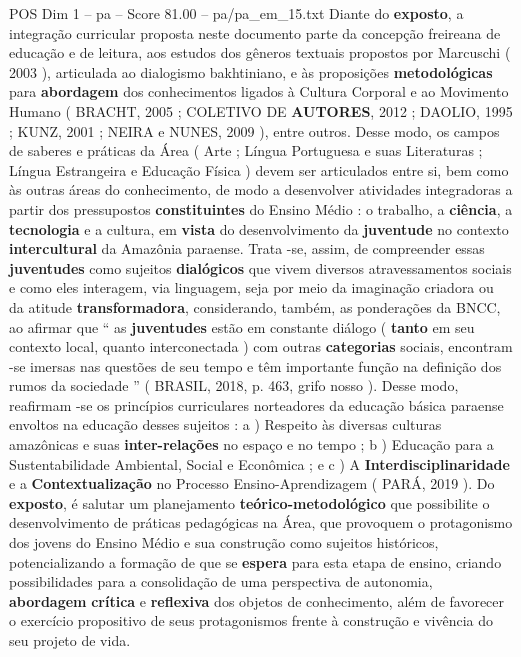 \begin{textsample}{POS Dim 1 – pa – Score 81.00 – pa/pa\_em\_15.txt}
Diante do \textbf{exposto}, a integração curricular proposta neste documento parte da concepção freireana de educação e de leitura, aos estudos dos gêneros textuais propostos por Marcuschi ( 2003 ), articulada ao dialogismo bakhtiniano, e às proposições \textbf{metodológicas} para \textbf{abordagem} dos conhecimentos ligados à Cultura Corporal e ao Movimento Humano ( BRACHT, 2005 ; COLETIVO DE \textbf{AUTORES}, 2012 ; DAOLIO, 1995 ; KUNZ, 2001 ; NEIRA e NUNES, 2009 ), entre outros.
Desse modo, os campos de saberes e práticas da Área ( Arte ; Língua Portuguesa e suas Literaturas ; Língua Estrangeira e Educação Física ) devem ser articulados entre si, bem como às outras áreas do conhecimento, de modo a desenvolver atividades integradoras a partir dos pressupostos \textbf{constituintes} do Ensino Médio : o trabalho, a \textbf{ciência}, a \textbf{tecnologia} e a cultura, em \textbf{vista} do desenvolvimento da \textbf{juventude} no contexto \textbf{intercultural} da Amazônia paraense.
Trata -se, assim, de compreender essas \textbf{juventudes} como sujeitos \textbf{dialógicos} que vivem diversos atravessamentos sociais e como eles interagem, via linguagem, seja por meio da imaginação criadora ou da atitude \textbf{transformadora}, considerando, também, as ponderações da BNCC, ao afirmar que “ as \textbf{juventudes} estão em constante diálogo ( \textbf{tanto} em seu contexto local, quanto interconectada ) com outras \textbf{categorias} sociais, encontram -se imersas nas questões de seu tempo e têm importante função na definição dos rumos da sociedade ” ( BRASIL, 2018, p. 463, grifo nosso ).
Desse modo, reafirmam -se os princípios curriculares norteadores da educação básica paraense envoltos na educação desses sujeitos : a ) Respeito às diversas culturas amazônicas e suas \textbf{inter-relações} no espaço e no tempo ; b ) Educação para a Sustentabilidade Ambiental, Social e Econômica ; e c ) A \textbf{Interdisciplinaridade} e a \textbf{Contextualização} no Processo Ensino-Aprendizagem ( PARÁ, 2019 ).
Do \textbf{exposto}, é salutar um planejamento \textbf{teórico-metodológico} que possibilite o desenvolvimento de práticas pedagógicas na Área, que provoquem o protagonismo dos jovens do Ensino Médio e sua construção como sujeitos históricos, potencializando a formação de que se \textbf{espera} para esta etapa de ensino, criando possibilidades para a consolidação de uma perspectiva de autonomia, \textbf{abordagem} \textbf{crítica} e \textbf{reflexiva} dos objetos de conhecimento, além de favorecer o exercício propositivo de seus protagonismos frente à construção e vivência do seu projeto de vida.

\end{textsample}
